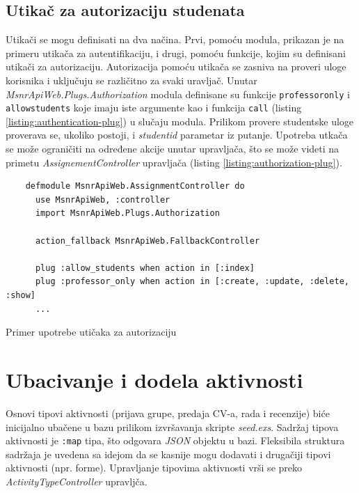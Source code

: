 \documentclass[12pt,oneside]{memoir}
\begin{document}
\subsection{Utikač za autorizaciju studenata}
Utikači se mogu definisati na dva načina. Prvi, pomoću modula, prikazan je na primeru utikača za autentifikaciju,
i drugi, pomoću funkcije, kojim su definisani utikači za autorizaciju. Autorizacija pomoću utikača se zasniva na
proveri uloge korisnika i uključuju se različitno za svaki uravljač.
Unutar \emph{MsnrApiWeb.Plugs.Authorization} modula
definisane su funkcije \texttt{professor{\textunderscore}only} i \texttt{allow{\textunderscore}students} koje imaju
iste argumente kao i funkcija \texttt{call} (listing \ref{listing:authentication-plug}) u slučaju modula.
Prilikom provere studentske uloge proverava se, ukoliko postoji, i \emph{student{\textunderscore}id} parametar iz putanje.
Upotreba utkača se može ograničiti na određene akcije unutar upravljača, što se može videti na primetu \emph{AssignementController} upravljača (listing \ref{listing:authorization-plug}).
\begin{listing}[h!]
  \begin{verbatim}
    defmodule MsnrApiWeb.AssignmentController do
      use MsnrApiWeb, :controller
      import MsnrApiWeb.Plugs.Authorization
    
      action_fallback MsnrApiWeb.FallbackController
    
      plug :allow_students when action in [:index]
      plug :professor_only when action in [:create, :update, :delete, :show]
      ...
\end{verbatim}
\caption{Primer upotrebe utičaka za autorizaciju}
\label{listing:authorization-plug}
\end{listing}
\section{Ubacivanje i dodela aktivnosti}
Osnovi tipovi aktivnosti (prijava grupe, predaja CV-a, rada i recenzije) biće inicijalno ubačene u
bazu prilikom izvršavanja skripte \emph{seed.exs}. Sadržaj tipova aktivnosti je \texttt{:map} tipa, što odgovara
\emph{JSON} objektu u bazi. Fleksibila struktura sadržaja je uvedena sa idejom da se kasnije mogu dodavati i drugačiji
tipovi aktivnosti (npr. forme). Upravljanje tipovima aktivnosti vrši se preko \emph{ActivityTypeController} upravljča.
\end{document}
